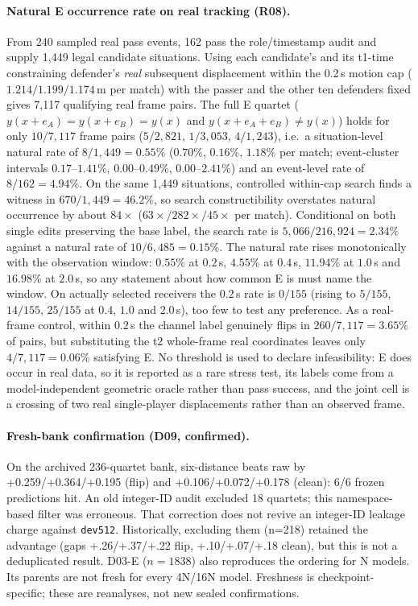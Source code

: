 \paragraph{Natural E occurrence rate on real tracking (R08).} From 240 sampled real pass events, 162 pass the role/timestamp audit and supply 1,449 legal candidate situations. Using each candidate's and its t1-time constraining defender's \emph{real} subsequent displacement within the 0.2\,s motion cap ($1.214/1.199/1.174$\,m per match) with the passer and the other ten defenders fixed gives 7,117 qualifying real frame pairs. The full E quartet ($y(x{+}e_A)=y(x{+}e_B)=y(x)$ and $y(x{+}e_A{+}e_B)\neq y(x)$) holds for only $10/7{,}117$ frame pairs ($5/2{,}821$, $1/3{,}053$, $4/1{,}243$), i.e.\ a situation-level natural rate of $8/1{,}449=0.55\%$ ($0.70\%$, $0.16\%$, $1.18\%$ per match; event-cluster intervals $0.17$--$1.41\%$, $0.00$--$0.49\%$, $0.00$--$2.41\%$) and an event-level rate of $8/162=4.94\%$. On the same 1,449 situations, controlled within-cap search finds a witness in $670/1{,}449=46.2\%$, so search constructibility overstates natural occurrence by about $84\times$ ($63\times/282\times/45\times$ per match). Conditional on both single edits preserving the base label, the search rate is $5{,}066/216{,}924=2.34\%$ against a natural rate of $10/6{,}485=0.15\%$. The natural rate rises monotonically with the observation window: $0.55\%$ at $0.2$\,s, $4.55\%$ at $0.4$\,s, $11.94\%$ at $1.0$\,s and $16.98\%$ at $2.0$\,s, so any statement about how common E is must name the window. On actually selected receivers the $0.2$\,s rate is $0/155$ (rising to $5/155$, $14/155$, $25/155$ at $0.4$, $1.0$ and $2.0$\,s), too few to test any preference. As a real-frame control, within $0.2$\,s the channel label genuinely flips in $260/7{,}117=3.65\%$ of pairs, but substituting the t2 whole-frame real coordinates leaves only $4/7{,}117=0.06\%$ satisfying E. No threshold is used to declare infeasibility: E does occur in real data, so it is reported as a rare stress test, its labels come from a model-independent geometric oracle rather than pass success, and the joint cell is a crossing of two real single-player displacements rather than an observed frame.
\paragraph{Fresh-bank confirmation (D09, confirmed).} On the archived 236-quartet bank, six-distance beats raw by +0.259/+0.364/+0.195 (flip) and +0.106/+0.072/+0.178 (clean): 6/6 frozen predictions hit. An old integer-ID audit excluded 18 quartets; this namespace-based filter was erroneous. That correction does not revive an integer-ID leakage charge against \texttt{dev512}. Historically, excluding them (n=218) retained the advantage (gaps +.26/+.37/+.22 flip, +.10/+.07/+.18 clean), but this is not a deduplicated result. D03-E ($n{=}1838$) also reproduces the ordering for N models. Its parents are not fresh for every 4N/16N model. Freshness is checkpoint-specific; these are reanalyses, not new sealed confirmations.
